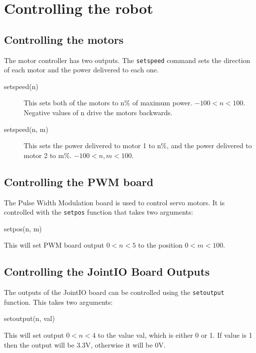 \documentclass[a4paper, 12pt]{article}
\begin{document}
\section{Controlling the robot}
\subsection{Controlling the motors}
The motor controller has two outputs.  The \texttt{setspeed} command
sets the direction of each motor and the power delivered to each one.

\begin{description}
\item[setspeed(n)] This sets both of the motors to n\% of maximum
power.  $-100<n<100$. Negative values of n drive the motors backwards.
\item[setspeed(n, m)] This sets the power delivered to motor 1 to n\%,
  and the power delivered to motor 2 to m\%. $-100<n,m<100$.
\end{description}

\subsection{Controlling the PWM board}
The Pulse Width Modulation board is used to control servo motors.  It is
controlled with the \texttt{setpos} function that takes two arguments:

\begin{verbatimtab}
setpos(n, m)
\end{verbatimtab}

This will set PWM board output $0<n<5$ to the position $0<m<100$.

\subsection{Controlling the JointIO Board Outputs}
The outputs of the JointIO board can be controlled using the \texttt{setoutput} function.  This takes two arguments:

\begin{verbatimtab}
setoutput(n, val)
\end{verbatimtab}

This will set output $0<n<4$ to the value val, which is either 0 or 1.  If value is 1 then the output will be 3.3V, otherwise it will be 0V.
\end{document}
